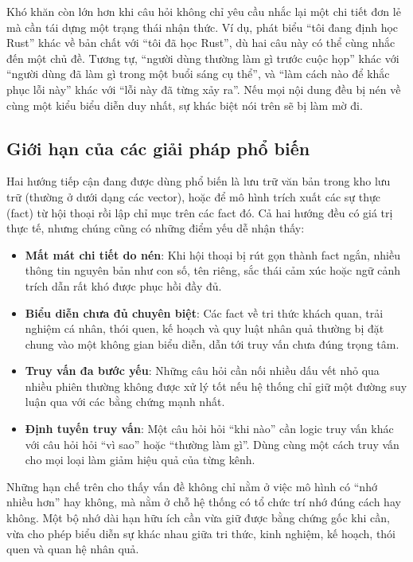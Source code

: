 \documentclass[../main.tex]{subfiles}
\begin{document}
Khó khăn còn lớn hơn khi câu hỏi không chỉ yêu cầu nhắc lại một chi tiết đơn lẻ mà cần tái dựng một trạng thái nhận thức. Ví dụ, phát biểu ``tôi đang định học Rust'' khác về bản chất với ``tôi đã học Rust'', dù hai câu này có thể cùng nhắc đến một chủ đề. Tương tự, ``người dùng thường làm gì trước cuộc họp'' khác với ``người dùng đã làm gì trong một buổi sáng cụ thể'', và ``làm cách nào để khắc phục lỗi này'' khác với ``lỗi này đã từng xảy ra''. Nếu mọi nội dung đều bị nén về cùng một kiểu biểu diễn duy nhất, sự khác biệt nói trên sẽ bị làm mờ đi.

\subsection{Giới hạn của các giải pháp phổ biến}

Hai hướng tiếp cận đang được dùng phổ biến là lưu trữ văn bản trong kho lưu trữ (thường ở dưới dạng các vector), hoặc để mô hình trích xuất các sự thực (fact) từ hội thoại rồi lập chỉ mục trên các fact đó. Cả hai hướng đều có giá trị thực tế, nhưng chúng cũng có những điểm yếu dễ nhận thấy:

\begin{itemize}
    \item \textbf{Mất mát chi tiết do nén}: Khi hội thoại bị rút gọn thành fact ngắn, nhiều thông tin nguyên bản như con số, tên riêng, sắc thái cảm xúc hoặc ngữ cảnh trích dẫn rất khó được phục hồi đầy đủ.
    \item \textbf{Biểu diễn chưa đủ chuyên biệt}: Các fact về tri thức khách quan, trải nghiệm cá nhân, thói quen, kế hoạch và quy luật nhân quả thường bị đặt chung vào một không gian biểu diễn, dẫn tới truy vấn chưa đúng trọng tâm.
    \item \textbf{Truy vấn đa bước yếu}: Những câu hỏi cần nối nhiều dấu vết nhỏ qua nhiều phiên thường không được xử lý tốt nếu hệ thống chỉ giữ một đường suy luận qua với các bằng chứng mạnh nhất.
    \item \textbf{Định tuyến truy vấn}: Một câu hỏi hỏi ``khi nào'' cần logic truy vấn khác với câu hỏi hỏi ``vì sao'' hoặc ``thường làm gì''. Dùng cùng một cách truy vấn cho mọi loại làm giảm hiệu quả của từng kênh.
\end{itemize}

Những hạn chế trên cho thấy vấn đề không chỉ nằm ở việc mô hình có ``nhớ nhiều hơn'' hay không, mà nằm ở chỗ hệ thống có tổ chức trí nhớ đúng cách hay không. Một bộ nhớ dài hạn hữu ích cần vừa giữ được bằng chứng gốc khi cần, vừa cho phép biểu diễn sự khác nhau giữa tri thức, kinh nghiệm, kế hoạch, thói quen và quan hệ nhân quả.
\end{document}
